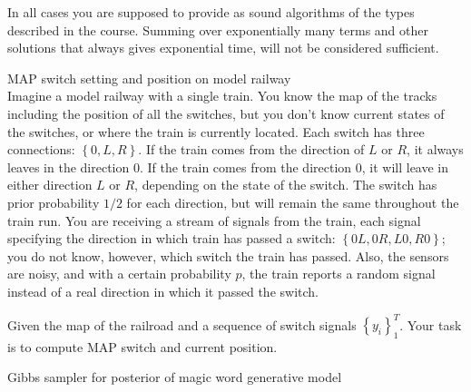 \documentclass[a4paper,twoside=false,abstract=false,numbers=noenddot,
titlepage=false,headings=small,parskip=half,version=last]{scrartcl}
\begin{document}
In all cases you are supposed to provide as sound algorithms of the types
described in the course.
Summing over exponentially many terms and other
solutions that always gives exponential time, will not be considered
sufficient.
\begin{exercise}{2} MAP switch setting and position on model railway \\ 
Imagine a model railway with a single train. You know the map of the tracks
including the position of all the switches, but you don't know current states
of the switches, or where the train is currently located. Each switch has three
connections: $\left\{0,L,R\right\}$. If the train comes from the direction of
$L$ or $R$, it always
leaves in the direction $0$. If the train comes from the direction $0$, it will
leave in either direction $L$ or $R$, depending on the state of the switch. The
switch has prior probability $1/2$ for each direction, but will remain the same
throughout the train run. You are receiving a stream of signals from the train,
each signal specifying the direction in which train has passed a switch: 
$\left\{0L,0R,L0,R0\right\}$; you do not know, however, 
which switch the train has passed.
Also, the sensors are noisy, and with a certain probability $p$, the train
reports a random signal instead of a real direction in which it passed the
switch.

Given the map of the railroad and a sequence of switch signals
$\left\{ y_i \right\}_1^T$. Your task is to compute MAP switch and current
position.
\end{exercise}
\begin{solution}
    
\end{solution}

\begin{exercise}{3}Gibbs sampler for posterior of magic word generative model\\
    
\end{exercise}
\begin{solution}
\end{solution}
\end{document}
